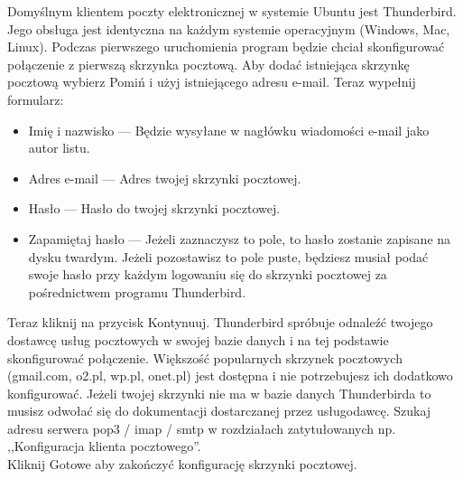 Domyślnym klientem poczty elektronicznej w systemie Ubuntu jest Thunderbird. Jego obsługa jest identyczna na każdym systemie operacyjnym (Windows, Mac, Linux). Podczas pierwszego uruchomienia program będzie chciał skonfigurować połączenie z pierwszą skrzynka pocztową. Aby dodać istniejąca skrzynkę pocztową wybierz \textcolor{ubuntu_orange}{Pomiń i użyj istniejącego adresu e-mail}. Teraz wypełnij formularz:
\begin{itemize}
\item \textcolor{ubuntu_orange}{Imię i nazwisko} --- Będzie wysyłane w nagłówku wiadomości e-mail jako autor listu.
\item \textcolor{ubuntu_orange}{Adres e-mail} --- Adres twojej skrzynki pocztowej.
\item \textcolor{ubuntu_orange}{Hasło} --- Hasło do twojej skrzynki pocztowej.
\item \textcolor{ubuntu_orange}{Zapamiętaj hasło} --- Jeżeli zaznaczysz to pole, to hasło zostanie zapisane na dysku twardym. Jeżeli pozostawisz to pole puste, będziesz musiał podać swoje hasło przy każdym logowaniu się do skrzynki pocztowej za pośrednictwem programu Thunderbird.
\end{itemize}

Teraz kliknij na przycisk \textcolor{ubuntu_orange}{Kontynuuj}. Thunderbird spróbuje odnaleźć twojego dostawcę usług pocztowych w swojej bazie danych i na tej podstawie skonfigurować połączenie. Większość popularnych skrzynek pocztowych (gmail.com, o2.pl, wp.pl, onet.pl) jest dostępna i nie potrzebujesz ich dodatkowo konfigurować. Jeżeli twojej skrzynki nie ma w bazie danych Thunderbirda to musisz odwołać się do dokumentacji dostarczanej przez usługodawcę. Szukaj adresu serwera pop3 / imap / smtp w rozdziałach zatytułowanych np. ,,Konfiguracja klienta pocztowego''.\\
Kliknij \textcolor{ubuntu_orange}{Gotowe} aby zakończyć konfigurację skrzynki pocztowej.

